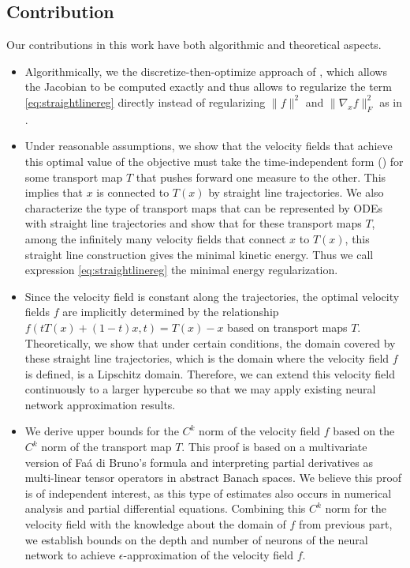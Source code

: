 \subsection{Contribution}
Our contributions in this work have both algorithmic and theoretical
aspects.
\begin{itemize}
\item Algorithmically, we  the
  discretize-then-optimize approach of \cite{OTFlow}, which allows the
  Jacobian to be computed exactly and thus allows to regularize the term \eqref{eq:straightlinereg}
  directly instead of regularizing $\|f\|^2$ and $\|\nabla_xf\|^2_F$
  as in \cite{HowToTrain}.
    
\item Under reasonable assumptions, we show that the velocity fields
  that achieve this optimal value of the objective must take the
  time-independent form ()
   for some transport map $T$
  that pushes forward one measure to the other. This implies
  that $x$ is connected to $T(x)$ by straight line trajectories. We
  also characterize the type of transport maps that can be represented
  by ODEs with straight line trajectories and show that for these
  transport maps $T$, among the infinitely many velocity fields that
  connect $x$ to $T(x)$, this straight line construction gives the
  minimal kinetic energy. Thus we call expression
  \eqref{eq:straightlinereg} the minimal energy regularization.
    
\item Since the velocity field is constant along the trajectories, the
  optimal velocity fields $f$ are implicitly determined by the
  relationship $f(tT(x) + (1-t)x, t) = T(x) - x$ based on transport
  maps $T$. Theoretically, we show that under certain conditions, the
  domain covered by these straight line trajectories, which is the
  domain where the velocity field $f$ is defined, is a Lipschitz
  domain. Therefore, we can extend this velocity field continuously to
  a larger hypercube so that we may apply existing neural network
  approximation results.
    
\item We derive upper bounds for the $C^k$ norm of the velocity field
  $f$ based on the $C^k$ norm of the transport map $T$. This proof is
  based on a multivariate version of Fa\'{a} di Bruno's formula and
  interpreting partial derivatives as multi-linear tensor operators in
  abstract Banach spaces. We believe this proof is of independent
  interest, as this type of estimates also occurs in numerical
  analysis and partial differential equations. Combining this $C^k$
  norm for the velocity field with the knowledge about the domain of
  $f$ from previous part, we establish bounds on the depth and number
  of neurons of the neural network to achieve $\epsilon$-approximation
  of the velocity field $f$.
    

\end{itemize}
